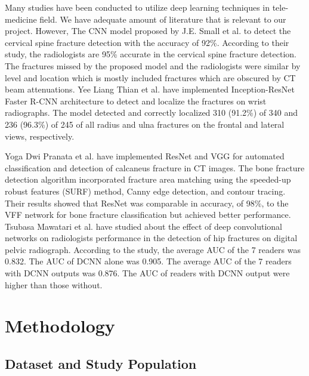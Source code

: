 \documentclass[pdflatex,sn-mathphys]{sn-jnl}%
\theoremstyle{thmstyleone}%
\theoremstyle{thmstyletwo}%
\theoremstyle{thmstylethree}%
\begin{document}
Many studies have been conducted to utilize deep learning techniques in tele-medicine field. We have adequate amount of literature that is relevant to our project. However, The CNN model proposed by J.E. Small et al. to detect the cervical spine fracture detection with the accuracy of 92\%\cite{Small:2021aa}. According to their study, the radiologists are 95\% accurate in the cervical spine fracture detection. The fractures missed by the proposed model and the radiologists were similar by level and location which is mostly included fractures which are obscured by CT beam attenuations. Yee Liang Thian et al.\cite{Thian:2019aa} have implemented Inception-ResNet Faster R-CNN  architecture to detect and localize the fractures on wrist radiographs. The model detected and correctly localized 310 (91.2\%) of 340 and 236 (96.3\%) of 245 of all radius and ulna fractures on the frontal and lateral views, respectively.

Yoga Dwi Pranata et al. have implemented ResNet and VGG for automated classification and detection of calcaneus fracture in CT images\cite{PRANATA201927}. The bone fracture detection algorithm incorporated fracture area matching using the speeded-up robust features (SURF) method, Canny edge detection, and contour tracing. Their results showed that ResNet was comparable in accuracy, of 98\%, to the VFF network for bone fracture classification but achieved better performance. Tsubasa Mawatari et al. have studied about the effect of deep convolutional networks on radiologists performance in the detection of hip fractures on digital pelvic radiograph. According to the study, the average AUC of the 7 readers was 0.832. The AUC of DCNN alone was 0.905. The average AUC of the 7 readers with DCNN outputs was 0.876. The AUC of readers with DCNN output were higher than those without\cite{Mawatari:2020aa}.

\section{Methodology}\label{sec2}

\subsection{Dataset and Study Population}\label{subsec2}
\end{document}
